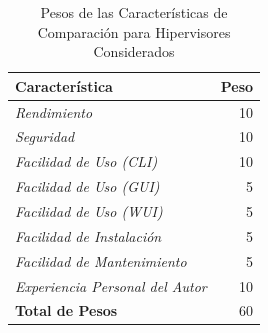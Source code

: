 \begin{table}
	\centering
	\begin{tabular}{|l|r|}
    	\hline
		\textbf{Característica} & \textbf{Peso} \\
        \hline
        \textit{Rendimiento} & 10 \\
        \textit{Seguridad} & 10 \\
        \textit{Facilidad de Uso (CLI)} & 10 \\
        \textit{Facilidad de Uso (GUI)} & 5 \\
        \textit{Facilidad de Uso (WUI)} & 5 \\
        \textit{Facilidad de Instalación} & 5 \\
        \textit{Facilidad de Mantenimiento} & 5 \\
        \textit{Experiencia Personal del Autor} & 10 \\
        \hline
        \textbf{Total de Pesos} & 60 \\
        \hline
	\end{tabular}
    \caption{Pesos de las Características de Comparación para Hipervisores Considerados}
    \label{tab:hipervisor-compar-pesos}
\end{table}

